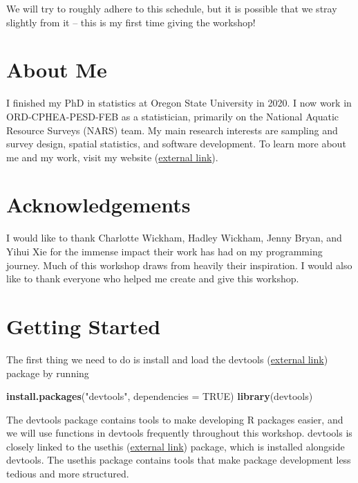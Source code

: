 \documentclass[
]{book}
\newenvironment{Shaded}{\begin{snugshade}}{\end{snugshade}}
\newcommand{\DataTypeTok}[1]{\textcolor[rgb]{0.13,0.29,0.53}{#1}}
\newcommand{\KeywordTok}[1]{\textcolor[rgb]{0.13,0.29,0.53}{\textbf{#1}}}
\newcommand{\NormalTok}[1]{#1}
\newcommand{\OtherTok}[1]{\textcolor[rgb]{0.56,0.35,0.01}{#1}}
\newcommand{\StringTok}[1]{\textcolor[rgb]{0.31,0.60,0.02}{#1}}
\begin{document}
We will try to roughly adhere to this schedule, but it is possible that we stray slightly from it -- this is my first time giving the workshop!

\hypertarget{about-me}{%
\section*{About Me}\label{about-me}}

I finished my PhD in statistics at Oregon State University in 2020. I now work in ORD-CPHEA-PESD-FEB as a statistician, primarily on the National Aquatic Resource Surveys (NARS) team. My main research interests are sampling and survey design, spatial statistics, and software development. To learn more about me and my work, visit my website (\href{https://michaeldumelle.github.io/}{external link}).

\hypertarget{acknowledgements}{%
\section*{Acknowledgements}\label{acknowledgements}}

I would like to thank Charlotte Wickham, Hadley Wickham, Jenny Bryan, and Yihui Xie for the immense impact their work has had on my programming journey. Much of this workshop draws from heavily their inspiration. I would also like to thank everyone who helped me create and give this workshop.

\hypertarget{getting-started}{%
\section*{Getting Started}\label{getting-started}}

The first thing we need to do is install and load the devtools (\href{https://devtools.r-lib.org/}{external link}) package by running

\begin{Shaded}
\begin{Highlighting}[]
\KeywordTok{install.packages}\NormalTok{(}\StringTok{"devtools"}\NormalTok{, }\DataTypeTok{dependencies =} \OtherTok{TRUE}\NormalTok{)}
\KeywordTok{library}\NormalTok{(devtools)}
\end{Highlighting}
\end{Shaded}

The devtools package contains tools to make developing R packages easier, and we will use functions in devtools frequently throughout this workshop. devtools is closely linked to the usethis (\href{https://usethis.r-lib.org/}{external link}) package, which is installed alongside devtools. The usethis package contains tools that make package development less tedious and more structured.
\end{document}
